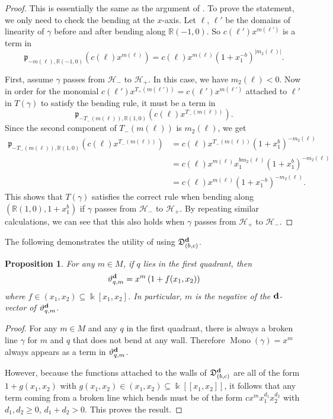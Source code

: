 \documentclass[11pt]{amsart}
\newtheorem{prop}[theorem]{Proposition}
\theoremstyle{remark}
\numberwithin{equation}{section}
\newcommand{\RR}{\mathbb{R}}
\newcommand{\fD}{\mathfrak{D}}
\newcommand{\fp}{\mathfrak{p}}
\newcommand{\bfd}{{\bf d}}
\newcommand{\Mono}{\operatorname{Mono}}
\begin{document}
\begin{proof}
  This is essentially the same as the argument of \cite[Prop.~3.6]{GHKK}.  To
  prove the statement, we only need to check the bending at the $x$-axis. Let
  $\ell$, $\ell'$ be the domains of linearity of $\gamma$ before and after bending
  along $\RR (-1,0)$. So $c(\ell') x^{m(\ell')}$ is a term in 
  \[
    \fp_{-m(\ell),\RR(-1,0)} \left(c(\ell) x^{m(\ell)}\right)
    = 
    c(\ell) x^{m(\ell)} \left(1+x_1^{-b}\right) ^{|m_2(\ell)|}.
  \]

  First, assume $\gamma$ passes from $\mathcal{H}_-$ to $\mathcal{H}_+$. In this
  case, we have $m_2(\ell) < 0$. Now in order for the monomial
  $c(\ell')x^{T_+(m(\ell'))} =c(\ell')x^{m(\ell')}$ attached to $\ell'$ in
  $T(\gamma)$ to satisfy the bending rule, it must be a term in
  \[
    \fp_{-T_-(m(\ell)),\RR (1,0)} \left(c(\ell) x^{T_-(m(\ell))}\right). 
  \]
  Since the second component of $T_-(m(\ell))$ is $m_2(\ell)$, we get
  \begin{align*} 
    \fp_{-T_-(m(\ell)),\RR (1,0)} \left(c(\ell) x^{T_-(m(\ell))}\right) 
    &=c(\ell) x^{T_-(m(\ell))} \left(1+x_1^b\right) ^{-m_2(\ell)}\\
    &=c(\ell) x^{m(\ell)} x_1^{b m_2(\ell)}\left(1+x_1^b\right)^{-m_2(\ell)}\\
    &=c(\ell) x^{m(\ell)} \left(1+x_1^{-b}\right) ^{-m_2(\ell)}.
  \end{align*}
  This shows that $T(\gamma)$ satisfies the correct rule when bending along
  $(\RR (1,0), 1+x_1^b)$ if $\gamma$ passes from $\mathcal{H}_-$ to
  $\mathcal{H}_+$. By repeating similar calculations, we can see that this also
  holds when $\gamma$ passes from $\mathcal{H}_+$ to $\mathcal{H}_-$.
\end{proof}

The following demonstrates the utility of using $\fD_{(b,c)}^\bfd$.
\begin{prop}
  For any  $m\in M$, if $q$ lies in the first quadrant, then 
  \[
    \vartheta^\bfd_{q, m}=x^{m}\left(1+f(x_1,x_2)\right)
  \]
  where $f\in (x_1,x_2)\subseteq \Bbbk[x_1,x_2]$.
  In particular, $m$ is the negative of the $\bfd$-vector of
  $\vartheta^\bfd_{q,m}$.
\end{prop}

\begin{proof}
  For any $m\in M$ and any $q$ in the first quadrant, there is always a broken
  line $\gamma$ for $m$ and $q$ that does not bend at any wall. Therefore $\Mono
  (\gamma) = x^{m}$ always appears as a term in $\vartheta^\bfd_{q,m}$.

  However, because the functions attached to the walls of
  $\fD_{(b,c)}^\bfd$ are all of the form $1+g(x_1,x_2)$ with $g(x_1,x_2) \in
  (x_1,x_2) \subseteq \Bbbk[[x_1,x_2]]$, it follows that any term coming from a
  broken line which bends must be of the form $cx^{m}x_1^{d_1}x_2^{d_2}$ with
  $d_1,d_2\ge 0$, $d_1+d_2>0$. This proves the result.
\end{proof}
\end{document}
